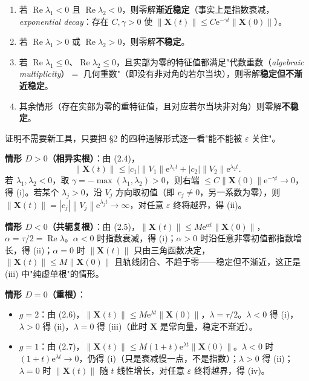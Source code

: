 \documentclass[11pt]{ctexart}
\newcommand{\X}{\mathbf{X}}\newcommand{\Y}{\mathbf{Y}}
\newcommand{\eps}{\varepsilon}
\newcommand{\abs}[1]{\left|#1\right|}
\newcommand{\norm}[1]{\left\lVert#1\right\rVert}
\newcommand{\EN}[1]{\textcolor{inkgray}{\itshape #1}}
\begin{document}
\begin{enumerate}
\item[(i)] 若 $\operatorname{Re}\lambda_1<0$ 且 $\operatorname{Re}\lambda_2<0$，则零解\textbf{渐近稳定}（事实上是指数衰减，\EN{exponential decay}：存在 $C,\gamma>0$ 使 $\norm{\X(t)}\le C\mathrm{e}^{-\gamma t}\norm{\X(0)}$）。
\item[(ii)] 若 $\operatorname{Re}\lambda_1>0$ 或 $\operatorname{Re}\lambda_2>0$，则零解\textbf{不稳定}。
\item[(iii)] 若 $\operatorname{Re}\lambda_1\le0$、$\operatorname{Re}\lambda_2\le0$，且实部为零的特征值都满足"代数重数（\EN{algebraic multiplicity}）$=$ 几何重数"（即没有非对角的若尔当块），则零解\textbf{稳定但不渐近稳定}。
\item[(iv)] 其余情形（存在实部为零的重特征值，且对应若尔当块非对角）则零解\textbf{不稳定}。
\end{enumerate}


证明不需要新工具，只要把 §2 的四种通解形式逐一看"能不能被 $\eps$ 关住"。

\textbf{情形 $D>0$（相异实根）}：由 (2.4)，
\[
\norm{\X(t)}\le\abs{c_1}\norm{V_1}\mathrm{e}^{\lambda_1t}+\abs{c_2}\norm{V_2}\mathrm{e}^{\lambda_2t}.
\]
若 $\lambda_1,\lambda_2<0$，取 $\gamma=-\max(\lambda_1,\lambda_2)>0$，则右端 $\le C\norm{\X(0)}\mathrm{e}^{-\gamma t}\to0$，得 (i)。若某个 $\lambda_j>0$，沿 $V_j$ 方向取初值（即 $c_j\neq0$，另一系数为零），则 $\norm{\X(t)}=\abs{c_j}\norm{V_j}\mathrm{e}^{\lambda_jt}\to\infty$，对任意 $\eps$ 终将越界，得 (ii)。

\textbf{情形 $D<0$（共轭复根）}：由 (2.5)，$\norm{\X(t)}\le M\mathrm{e}^{\alpha t}\norm{\X(0)}$，$\alpha=\tau/2=\operatorname{Re}\lambda$。$\alpha<0$ 时指数衰减，得 (i)；$\alpha>0$ 时沿任意非零初值都指数增长，得 (ii)；$\alpha=0$ 时 $\norm{\X(t)}$ 只由三角函数决定，$\norm{\X(t)}\le M\norm{\X(0)}$ 且轨线闭合、不趋于零——稳定但不渐近，这正是 (iii) 中"纯虚单根"的情形。

\textbf{情形 $D=0$（重根）}：
\begin{itemize}
\item $g=2$：由 (2.6)，$\norm{\X(t)}\le M\mathrm{e}^{\lambda t}\norm{\X(0)}$，$\lambda=\tau/2$。$\lambda<0$ 得 (i)，$\lambda>0$ 得 (ii)，$\lambda=0$ 得 (iii)（此时 $\X$ 是常向量，稳定不渐近）。
\item $g=1$：由 (2.7)，$\norm{\X(t)}\le M(1+t)\mathrm{e}^{\lambda t}\norm{\X(0)}$。$\lambda<0$ 时 $(1+t)\mathrm{e}^{\lambda t}\to0$，仍得 (i)（只是衰减慢一点，不是指数）；$\lambda>0$ 得 (ii)；$\lambda=0$ 时 $\norm{\X(t)}$ 随 $t$ 线性增长，对任意 $\eps$ 终将越界，得 (iv)。
\end{itemize}
\end{document}
